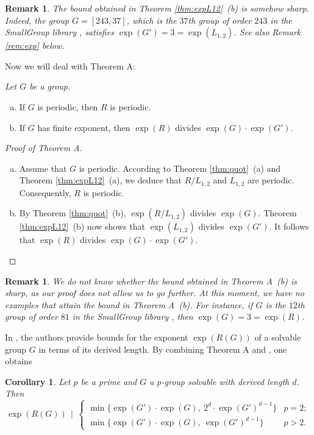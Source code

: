 \documentclass[12pt,leqno]{amsart}
\newtheorem{cor}[theorem]{\sc Corollary}
\newtheorem{remar}[theorem]{\sc Remark}
\begin{document}
\begin{remar}
The bound obtained in Theorem \ref{thm:expL12}~(b) is somehow sharp. Indeed, the group $G = [243,37]$, which is the $37$th group of order $243$ in the SmallGroup library \cite{GAP4}, satisfies $\exp(G') = 3 = \exp(L_{1,2})$. See also Remark \ref{rem:exp} below.     
\end{remar}

Now we will deal with Theorem A: {\it Let $G$ be a group. 

\begin{enumerate} [(a)]
    \item If $G$ is periodic, then $R$ is periodic.
    \item If $G$ has finite exponent, then $\exp(R)$ divides $\exp(G) \cdot \exp(G')$.
\end{enumerate}
}
\begin{proof}[Proof of Theorem A]
\begin{enumerate}[(a)]
    \item Assume that $G$ is periodic. According to Theorem \ref{thm:quot}~(a) and Theorem \ref{thm:expL12}~(a), we deduce that $R/L_{1,2}$ and $L_{1,2}$ are periodic. Consequently, $R$ is periodic. 
    \item By Theorem \ref{thm:quot}~(b), $\exp(R/L_{1,2})$ divides $\exp(G)$. Theorem \ref{thm:expL12}~(b) now shows that $\exp(L_{1,2})$ divides $\exp(G')$. It follows that $\exp(R)$ divides $\exp(G) \cdot \exp(G')$.  \qedhere
\end{enumerate}
\end{proof}

\begin{remar}
\label{rem:example}
We do not know whether the bound obtained in Theorem A~(b) is sharp, as our proof does not allow us to go further. At this moment, we have no examples that attain the bound in Theorem A~(b). For instance, if $G$ is the $12$th group of order $81$ in the SmallGroup library \cite{GAP4}, then $\exp(G) = 3 = \exp(R)$.
\end{remar}

In \cite{BdMdOM}, the authors provide bounds for the exponent $\exp(R(G))$ of a solvable group $G$ in terms of its derived length. By combining Theorem A and \cite[Theorem 1.6]{BdMdOM}, one obtains

\begin{cor}
Let $p$ be a prime and $G$ a $p$-group solvable with derived length $d$. Then 
 $$\exp(R(G)) \ \ |\ \ \left\{\begin{array}{rl}
 \min \{\exp(G')\cdot\exp(G), \ 2^d \cdot \exp(G')^{d-1}\} & p=2;\\
 \min \{\exp(G')\cdot\exp(G),\ \exp(G')^{d-1}\} & p>2.
 \end{array}\right.$$    
\end{cor}
\end{document}

